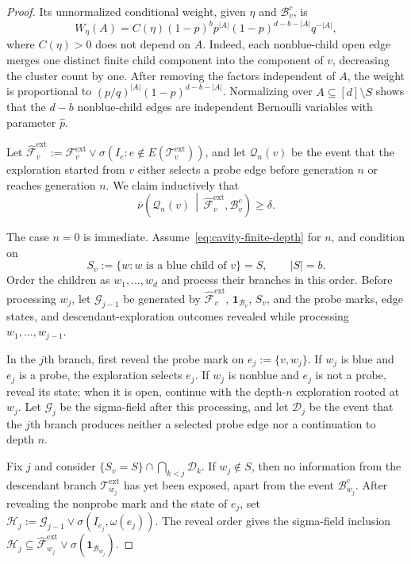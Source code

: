 \documentclass[10pt,a4paper]{amsart}
\begin{document}
\begin{proof}
Its unnormalized conditional weight, given $\eta$ and $\mathcal B_v^c$, is
\[
    W_\eta(A)
    =
    C(\eta)
    (1-p)^b
    p^{|A|}
    (1-p)^{d-b-|A|}
    q^{-|A|},
\]
where $C(\eta)>0$ does not depend on $A$. Indeed, each nonblue-child open edge merges one distinct finite child component into the component of $v$, decreasing the cluster count by one. After removing the factors independent of $A$, the weight is proportional to $\left(p/q\right)^{|A|}(1-p)^{d-b-|A|}$. Normalizing over $A\subseteq[d]\setminus S$ shows that the $d-b$ nonblue-child edges are independent Bernoulli variables with parameter $\widehat p$.

Let $\widehat{\mathcal F}_v^{\mathrm{ext}}:=\mathcal F_v^{\mathrm{ext}}\vee\sigma\left(I_e:e\notin E(\mathcal T_v^{\mathrm{ext}})\right)$, and let $\mathcal Q_n(v)$ be the event that the exploration started from $v$ either selects a probe edge before generation $n$ or reaches generation $n$. We claim inductively that
\begin{equation}
\label{eq:cavity-finite-depth}
    \overline\nu\left(
        \mathcal Q_n(v)
        \,\middle|\,
        \widehat{\mathcal F}_v^{\mathrm{ext}},
        \mathcal B_v^c
    \right)
    \ge\delta.
\end{equation}

The case $n=0$ is immediate. Assume~\eqref{eq:cavity-finite-depth} for $n$, and condition on
\[
    S_v:=\{w:w\text{ is a blue child of }v\}=S,
    \qquad
    |S|=b.
\]
Order the children as $w_1,\ldots,w_d$ and process their branches in this order. Before processing $w_j$, let $\mathcal G_{j-1}$ be generated by $\widehat{\mathcal F}_v^{\mathrm{ext}}$, $\mathbf 1_{\mathcal B_v}$, $S_v$, and the probe marks, edge states, and descendant-exploration outcomes revealed while processing $w_1,\ldots,w_{j-1}$. 

In the $j$th branch, first reveal the probe mark on $e_j:=\{v,w_j\}$. If $w_j$ is blue and $e_j$ is a probe, the exploration selects $e_j$. If $w_j$ is nonblue and $e_j$ is not a probe, reveal its state; when it is open, continue with the depth-$n$ exploration rooted at $w_j$. Let $\mathcal G_j$ be the sigma-field after this processing, and let $\mathcal D_j$ be the event that the $j$th branch produces neither a selected probe edge nor a continuation to depth $n$.

Fix $j$ and consider $\{S_v=S\}\cap\bigcap_{k<j}\mathcal D_k$. If $w_j\notin S$, then no information from the descendant branch $\mathcal T_{w_j}^{\mathrm{ext}}$ has yet been exposed, apart from the event $\mathcal B_{w_j}^c$. After revealing the nonprobe mark and the state of $e_j$, set $\mathcal H_j:=\mathcal G_{j-1}\vee\sigma(I_{e_j},\omega(e_j))$. The reveal order gives the sigma-field inclusion $\mathcal H_j\subseteq\widehat{\mathcal F}_{w_j}^{\mathrm{ext}}\vee\sigma(\mathbf 1_{\mathcal B_{w_j}})$.


\end{proof}
\end{document}
